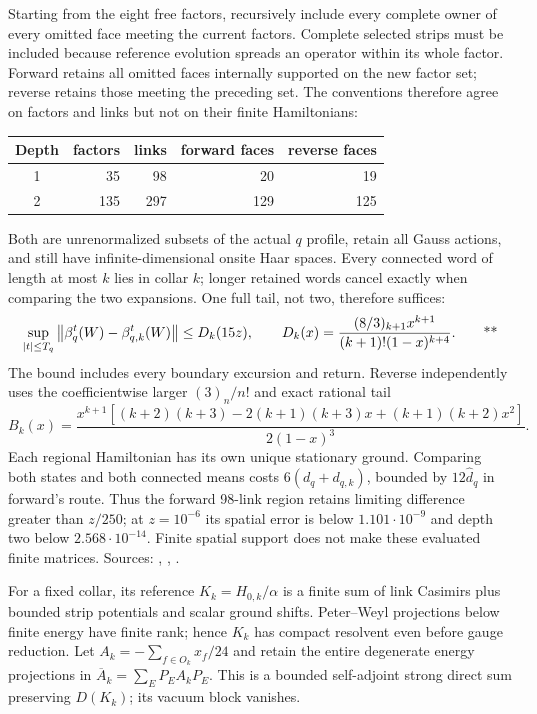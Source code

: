 Starting from the eight free factors, recursively include every complete owner
of every omitted face meeting the current factors.  Complete selected strips
must be included because reference evolution spreads an operator within its
whole factor.  Forward retains all omitted faces internally supported on the
new factor set; reverse retains those meeting the preceding set.  The conventions
therefore agree on factors and links but not on their finite Hamiltonians:
\begin{center}
\begin{tabular}{crrrr}
Depth & factors & links & forward faces & reverse faces\\\hline
1&35&98&20&19\\
2&135&297&129&125
\end{tabular}
\end{center}
Both are unrenormalized subsets of the actual $q$ profile, retain all Gauss
actions, and still have infinite-dimensional onsite Haar spaces.
Every connected word of length at most $k$ lies in collar $k$; longer retained
words cancel exactly when comparing the two expansions.  One full tail, not
two, therefore suffices:
\begin{equation}
 \sup_{|t|\le T_q}\left\lVert \beta_q^t(W)-\beta_{q,k}^t(W)\right\rVert
 \le D_k(15z),\qquad
 D_k(x)=\frac{(8/3)_{k+1}x^{k+1}}{(k+1)!(1-x)^{k+4}}.
 \qquad\text{**}
 \label{recent:spatial-tail}
\end{equation}
The bound includes every boundary excursion and return.  Reverse independently
uses the coefficientwise larger $(3)_n/n!$ and exact rational tail
\begin{equation}
 B_k(x)=\frac{x^{k+1}[(k+2)(k+3)-2(k+1)(k+3)x+(k+1)(k+2)x^2]}
 {2(1-x)^3}.
 \label{recent:reverse-spatial-tail}
\end{equation}
Each regional Hamiltonian has its own unique stationary ground.  Comparing both
states and both connected means costs
$6(d_q+d_{q,k})$, bounded by $12\widehat d_q$ in forward's route.
Thus the forward 98-link region retains limiting difference greater than $z/250$;
at $z=10^{-6}$ its spatial error is below $1.101\cdot10^{-9}$ and depth two
below $2.568\cdot10^{-14}$.  Finite spatial support does not make these evaluated
finite matrices.
Sources: ,
,
.

For a fixed collar, its reference $K_k=H_{0,k}/\alpha$ is a finite sum of link
Casimirs plus bounded strip potentials and scalar ground shifts.  Peter--Weyl
projections below finite energy have finite rank; hence $K_k$ has compact
resolvent even before gauge reduction.  Let
$A_k=-\sum_{f\in O_k}x_f/24$ and retain the entire degenerate energy projections
in $\overline A_k=\sum_EP_EA_kP_E$.  This is a bounded self-adjoint strong direct
sum preserving $D(K_k)$; its vacuum block vanishes.

